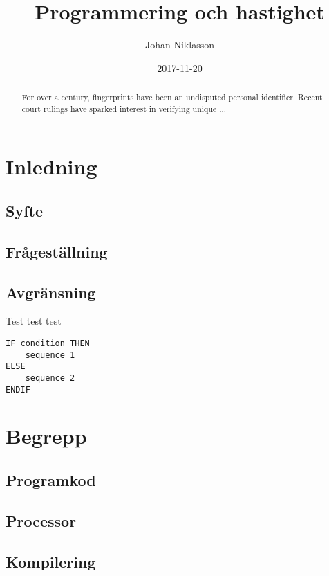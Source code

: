 \documentclass[12pt,swedish]{article}
\title{Programmering och hastighet}
\author{Johan Niklasson}
\date{2017-11-20}
\begin{document}

\maketitle
\normalsize
\begin{center}
    \begin{abstract}
        For over a century, fingerprints have been an undisputed
        personal identifier.  Recent court rulings have sparked
        interest in verifying unique ...
    \end{abstract}
\end{center}
\clearpage


\tableofcontents
\clearpage


\section{Inledning}
\subsection{Syfte}
\subsection{Frågeställning}
\subsection{Avgränsning}
Test test test \citep{maloney_resnick_rusk_silverman_eastmond_2010,bauer_wossner_1972}

\begin{lstlisting}
IF condition THEN
    sequence 1
ELSE
    sequence 2
ENDIF
\end{lstlisting}

\section{Begrepp}
\subsection{Programkod}
\subsection{Processor}
\subsection{Kompilering}
\end{document}
